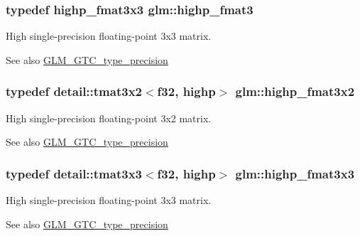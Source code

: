 \subsubsection[{\texorpdfstring{highp\+\_\+fmat3}{highp_fmat3}}]{\setlength{\rightskip}{0pt plus 5cm}typedef highp\+\_\+fmat3x3 {\bf glm\+::highp\+\_\+fmat3}}\hypertarget{group__gtc__type__precision_ga3ff9af2eba26aa6df92aa73e1083e81e}{}\label{group__gtc__type__precision_ga3ff9af2eba26aa6df92aa73e1083e81e}
High single-\/precision floating-\/point 3x3 matrix. \begin{DoxySeeAlso}{See also}
\hyperlink{group__gtc__type__precision}{G\+L\+M\+\_\+\+G\+T\+C\+\_\+type\+\_\+precision} 
\end{DoxySeeAlso}
\subsubsection[{\texorpdfstring{highp\+\_\+fmat3x2}{highp_fmat3x2}}]{\setlength{\rightskip}{0pt plus 5cm}typedef detail\+::tmat3x2$<$f32, highp$>$ {\bf glm\+::highp\+\_\+fmat3x2}}\hypertarget{group__gtc__type__precision_gad5c083691eb15539fd81e27e1dc6b813}{}\label{group__gtc__type__precision_gad5c083691eb15539fd81e27e1dc6b813}
High single-\/precision floating-\/point 3x2 matrix. \begin{DoxySeeAlso}{See also}
\hyperlink{group__gtc__type__precision}{G\+L\+M\+\_\+\+G\+T\+C\+\_\+type\+\_\+precision} 
\end{DoxySeeAlso}
\subsubsection[{\texorpdfstring{highp\+\_\+fmat3x3}{highp_fmat3x3}}]{\setlength{\rightskip}{0pt plus 5cm}typedef detail\+::tmat3x3$<$f32, highp$>$ {\bf glm\+::highp\+\_\+fmat3x3}}\hypertarget{group__gtc__type__precision_gaf1d697243b1de74a5769c49e68b1e2a6}{}\label{group__gtc__type__precision_gaf1d697243b1de74a5769c49e68b1e2a6}
High single-\/precision floating-\/point 3x3 matrix. \begin{DoxySeeAlso}{See also}
\hyperlink{group__gtc__type__precision}{G\+L\+M\+\_\+\+G\+T\+C\+\_\+type\+\_\+precision} 
\end{DoxySeeAlso}
